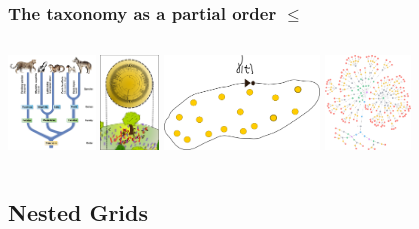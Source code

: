 \documentclass{beamer}
\begin{document}
\begin{frame}
\frametitle{The taxonomy as a partial order $\leq$ }
\begin{columns}[t]
        \centering
        \includegraphics[width=0.6\columnwidth,height=2.5cm]{mamalia.png}
		\centering		
		\includegraphics[width=0.6\columnwidth,height=2.5cm]{build_tree.png}
		\centering        
        \includegraphics[width=0.6\columnwidth,height=2.5cm]{area_occs.png}
		\centering        
        \includegraphics[width=0.6\columnwidth,height=2.5cm]{tree.png}
\end{columns}						
	\end{frame}	


\subsection{Nested Grids}
\end{document}
